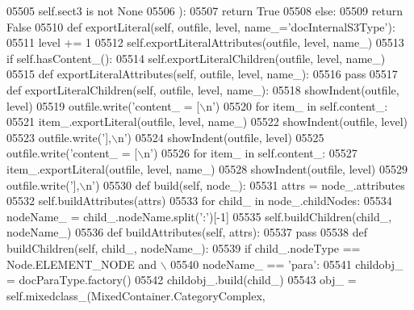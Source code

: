 \begin{DoxyCode}
{{{{{{{{{{{{{{{{{{{{{{{{{{{{{{{{{{{{{{{{{{{{{{{{{{{{{{{{{{{{{{{{{{{{{{{{{{{{{{{{{{{{{{{{{{{{{{{{{{{{{{{{{{{{{{{{{{{{{{{{{{{{{{{{{{{{{{{{{{{{{{{{{{{{{{{{{{{{{{{{{{{{{{{{{{{{{{{{{{{{{{{{{{{{{{{{{{{{{{{{{{{{{{{{{{{{{{{{{{{{{{{{{{{{{{{{{{{{{{{{{{{{{{{{{{{{{{{{{{{{{{{{{{{{{{{{{{{{{{{{{{{{{{{{{{{{{{{{{{{{{{{{{{{{{{{{{{{{{{{{{{{{{{{{{{{{{{{{{{{{{{{{05505             self.sect3 \textcolor{keywordflow}{is} \textcolor{keywordflow}{not} \textcolor{keywordtype}{None}
05506             ):
05507             \textcolor{keywordflow}{return} \textcolor{keyword}{True}
05508         \textcolor{keywordflow}{else}:
05509             \textcolor{keywordflow}{return} \textcolor{keyword}{False}
05510     \textcolor{keyword}{def }exportLiteral(self, outfile, level, name\_='docInternalS3Type'):
05511         level += 1
05512         self.exportLiteralAttributes(outfile, level, name\_)
05513         \textcolor{keywordflow}{if} self.hasContent_():
05514             self.exportLiteralChildren(outfile, level, name\_)
05515     \textcolor{keyword}{def }exportLiteralAttributes(self, outfile, level, name\_):
05516         \textcolor{keywordflow}{pass}
05517     \textcolor{keyword}{def }exportLiteralChildren(self, outfile, level, name\_):
05518         showIndent(outfile, level)
05519         outfile.write(\textcolor{stringliteral}{'content\_ = [\(\backslash\)n'})
05520         \textcolor{keywordflow}{for} item\_ \textcolor{keywordflow}{in} self.content\_:
05521             item\_.exportLiteral(outfile, level, name\_)
05522         showIndent(outfile, level)
05523         outfile.write(\textcolor{stringliteral}{'],\(\backslash\)n'})
05524         showIndent(outfile, level)
05525         outfile.write(\textcolor{stringliteral}{'content\_ = [\(\backslash\)n'})
05526         \textcolor{keywordflow}{for} item\_ \textcolor{keywordflow}{in} self.content\_:
05527             item\_.exportLiteral(outfile, level, name\_)
05528         showIndent(outfile, level)
05529         outfile.write(\textcolor{stringliteral}{'],\(\backslash\)n'})
05530     \textcolor{keyword}{def }build(self, node\_):
05531         attrs = node\_.attributes
05532         self.buildAttributes(attrs)
05533         \textcolor{keywordflow}{for} child\_ \textcolor{keywordflow}{in} node\_.childNodes:
05534             nodeName\_ = child\_.nodeName.split(\textcolor{stringliteral}{':'})[-1]
05535             self.buildChildren(child\_, nodeName\_)
05536     \textcolor{keyword}{def }buildAttributes(self, attrs):
05537         \textcolor{keywordflow}{pass}
05538     \textcolor{keyword}{def }buildChildren(self, child\_, nodeName\_):
05539         \textcolor{keywordflow}{if} child\_.nodeType == Node.ELEMENT\_NODE \textcolor{keywordflow}{and} \(\backslash\)
05540             nodeName\_ == \textcolor{stringliteral}{'para'}:
05541             childobj\_ = docParaType.factory()
05542             childobj\_.build(child\_)
05543             obj\_ = self.mixedclass\_(MixedContainer.CategoryComplex,
}}}}}}}}}}}}}}}}}}}}}}}}}}}}}}}}}}}}}}}}}}}}}}}}}}}}}}}}}}}}}}}}}}}}}}}}}}}}}}}}}}}}}}}}}}}}}}}}}}}}}}}}}}}}}}}}}}}}}}}}}}}}}}}}}}}}}}}}}}}}}}}}}}}}}}}}}}}}}}}}}}}}}}}}}}}}}}}}}}}}}}}}}}}}}}}}}}}}}}}}}}}}}}}}}}}}}}}}}}}}}}}}}}}}}}}}}}}}}}}}}}}}}}}}}}}}}}}}}}}}}}}}}}}}}}}}}}}}}}}}}}}}}}}}}}}}}}}}}}}}}}}}}}}}}}}}}}}}}}}}}}}}}}}}}}}}}}}}}}}}}}}}
\end{DoxyCode}
